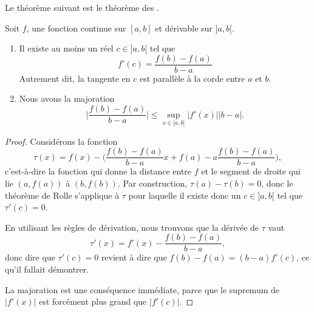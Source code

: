 Le théorème suivant est le théorème des .
\begin{theorem}       \label{ThoAccFinis}
    Soit $f$, une fonction continue sur $[a,b]$ et dérivable sur $]a,b[$.
        \begin{enumerate}
            \item       \label{ITEMooFZONooXJqLyX}
               Il existe au moins un réel $c\in]a,b[$ tel que
                   \begin{equation}
                       f'(c)=\frac{ f(b)-f(a) }{ b-a }
                   \end{equation}
                   Autrement dit, la tangente en \( c\) est parallèle à la corde entre \( a\) et \( b\).
               \item       \label{ITEMooXRQKooDBFpdQ}
               Nous avons la majoration
               \begin{equation}
                   \big| \frac{ f(b)-f(a) }{ b-a } \big| \leq \sup_{x\in\mathopen[ a , b \mathclose]}| f'(x) |  | b-a |.
               \end{equation}
        \end{enumerate}
\end{theorem}

\begin{proof}
    Considérons la fonction
    \begin{equation}
        \tau(x)=f(x)-\big( \frac{ f(b)-f(a) }{ b-a }x + f(a) - a\frac{ f(b)-f(a) }{ b-a } \big),
    \end{equation}
    c'est-à-dire la fonction qui donne la distance entre $f$ et le segment de droite qui lie $(a,f(a))$ à $(b,f(b))$. Par construction, $\tau(a)-\tau(b)=0$, donc le théorème de Rolle s'applique à $\tau$ pour laquelle il existe donc un $c\in]a,b[$ tel que $\tau'(c)=0$.

    En utilisant les règles de dérivation, nous trouvons que la dérivée de $\tau$ vaut
    \begin{equation}
        \tau'(x)= f'(x)-\frac{ f(b)-f(a) }{ b-a },
    \end{equation}
    donc dire que $\tau'(c)=0$ revient à dire que $f(b)-f(a)=(b-a)f'(c)$, ce qu'il fallait démontrer.

    La majoration est une conséquence immédiate, parce que le supremum de \( | f'(x) |\) est forcément plus grand que \( | f'(c) |\).
\end{proof}

